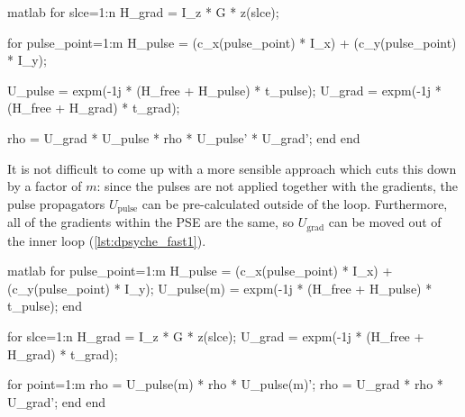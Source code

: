\begin{mylisting}[htb]
    \centering
\begin{tcbminted}{matlab}
for slce=1:n
    H_grad = I_z * G * z(slce);

    for pulse_point=1:m
        H_pulse = (c_x(pulse_point) * I_x) + (c_y(pulse_point) * I_y);

        U_pulse = expm(-1j * (H_free + H_pulse) * t_pulse);
        U_grad = expm(-1j * (H_free + H_grad) * t_grad);

        rho = U_grad * U_pulse * rho * U_pulse' * U_grad';
    end
end
\end{tcbminted}
\caption[Naive dPSYCHE code]{Rough structure of a naive dPSYCHE implementation. Note that I use the variable name \texttt{slce} as \texttt{slice} is an existing builtin Matlab function.}
\label{lst:dpsyche_slow}
\end{mylisting}

It is not difficult to come up with a more sensible approach which cuts this down by a factor of $m$: since the pulses are not applied together with the gradients, the pulse propagators $U_\text{pulse}$ can be pre-calculated outside of the loop.
Furthermore, all of the gradients within the PSE are the same, so $U_\text{grad}$ can be moved out of the inner loop (\cref{lst:dpsyche_fast1}).

\begin{mylisting}[htb]
    \centering
\begin{tcbminted}{matlab}
for pulse_point=1:m
    H_pulse = (c_x(pulse_point) * I_x) + (c_y(pulse_point) * I_y);
    U_pulse(m) = expm(-1j * (H_free + H_pulse) * t_pulse);
end

for slce=1:n
    H_grad = I_z * G * z(slce);
    U_grad = expm(-1j * (H_free + H_grad) * t_grad);
    
    for point=1:m
        rho = U_pulse(m) * rho * U_pulse(m)';
        rho = U_grad * rho * U_grad';
    end
end
\end{tcbminted}
\caption[Slightly faster dPSYCHE code]{Rough structure of a slightly faster implementation of dPSYCHE.}
\label{lst:dpsyche_fast1}
\end{mylisting}

